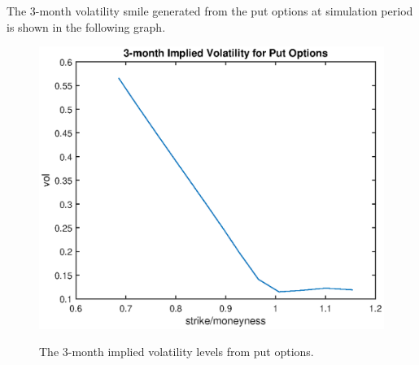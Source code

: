 \documentclass{article}
\begin{document}
The 3-month volatility smile generated from the put options at simulation period is shown in the following graph. %

\begin{center}
\begin{figure}
  \centering
  \includegraphics[scale = 0.5]{implied_vol.eps}\\
  \caption{The 3-month implied volatility levels from put options.}\label{fig::Put_Option_Vols}
\end{figure}
\end{center}
\end{document}
